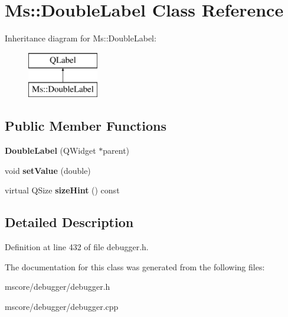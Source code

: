\hypertarget{class_ms_1_1_double_label}{}\section{Ms\+:\+:Double\+Label Class Reference}
\label{class_ms_1_1_double_label}
Inheritance diagram for Ms\+:\+:Double\+Label\+:\begin{figure}[H]
\begin{center}
\leavevmode
\includegraphics[height=2.000000cm]{class_ms_1_1_double_label}
\end{center}
\end{figure}
\subsection*{Public Member Functions}
\begin{DoxyCompactItemize}
\item 
\mbox{\label{class_ms_1_1_double_label_abb73ec323a264520e5a1bcb57ddf56d3}} 
{\bfseries Double\+Label} (Q\+Widget $\ast$parent)
\item 
\mbox{\label{class_ms_1_1_double_label_a9c8733f48cda6693c5d82e79290cc2f9}} 
void {\bfseries set\+Value} (double)
\item 
\mbox{\label{class_ms_1_1_double_label_accbb8ae792f58093e2ae19dbbee2abdb}} 
virtual Q\+Size {\bfseries size\+Hint} () const
\end{DoxyCompactItemize}


\subsection{Detailed Description}


Definition at line 432 of file debugger.\+h.



The documentation for this class was generated from the following files\+:\begin{DoxyCompactItemize}
\item 
mscore/debugger/debugger.\+h\item 
mscore/debugger/debugger.\+cpp\end{DoxyCompactItemize}
